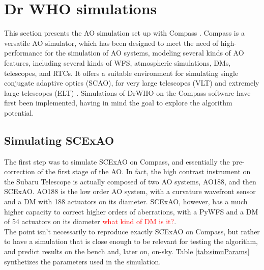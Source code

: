 \documentclass[twocolumn]{aastex62}
\begin{document}
\section{Dr WHO simulations}

This section presents the AO simulation set up with Compass \citep{Compass}.
Compass is a versatile AO simulator, which has been designed to meet the need of high-performance for the simulation of AO systems, modeling several kinds of AO features, including several kinds of WFS, atmospheric simulations, DMs, telescopes, and RTCs. It offers a suitable environment for simulating single conjugate adaptive optics (SCAO), for very large telescopes (VLT) and extremely large telescopes (ELT) \citep{Vidal2018}.  Simulations of DrWHO on the Compass software have first been implemented, having in mind the goal to explore the algorithm potential. 


\subsection{Simulating SCExAO}

The first step was to simulate SCExAO on Compass, and essentially the pre-correction of the first stage of the AO. In fact, the high contrast instrument on the Subaru Telescope is actually composed of two AO systems, AO188, and then SCExAO. AO188 is the low order AO system, with a curvature wavefront sensor and a DM with 188 actuators on its diameter. SCExAO, however, has a much higher capacity to correct higher orders of aberrations, with a PyWFS and a DM of 54 actuators on its diameter \textcolor{red}{what kind of DM is it?}. \\

The point isn't necessarily to reproduce exactly SCExAO on Compass, but rather to have a simulation that is close enough to be relevant for testing the algorithm, and predict results on the bench and, later on, on-sky. Table \ref{tab:simuParams} synthetizes the parameters used in the simulation.\\
\end{document}
